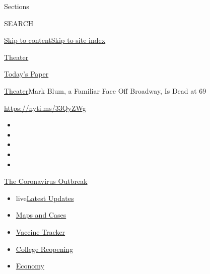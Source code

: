 Sections

SEARCH

\protect\hyperlink{site-content}{Skip to
content}\protect\hyperlink{site-index}{Skip to site index}

\href{https://www.nytimes3xbfgragh.onion/section/theater}{Theater}

\href{https://myaccount.nytimes3xbfgragh.onion/auth/login?response_type=cookie\&client_id=vi}{}

\href{https://www.nytimes3xbfgragh.onion/section/todayspaper}{Today's
Paper}

\href{/section/theater}{Theater}\textbar{}Mark Blum, a Familiar Face Off
Broadway, Is Dead at 69

\url{https://nyti.ms/33QyZWg}

\begin{itemize}
\item
\item
\item
\item
\item
\end{itemize}

\href{https://www.nytimes3xbfgragh.onion/news-event/coronavirus?action=click\&pgtype=Article\&state=default\&region=TOP_BANNER\&context=storylines_menu}{The
Coronavirus Outbreak}

\begin{itemize}
\tightlist
\item
  live\href{https://www.nytimes3xbfgragh.onion/2020/08/04/world/coronavirus-covid-19.html?action=click\&pgtype=Article\&state=default\&region=TOP_BANNER\&context=storylines_menu}{Latest
  Updates}
\item
  \href{https://www.nytimes3xbfgragh.onion/interactive/2020/us/coronavirus-us-cases.html?action=click\&pgtype=Article\&state=default\&region=TOP_BANNER\&context=storylines_menu}{Maps
  and Cases}
\item
  \href{https://www.nytimes3xbfgragh.onion/interactive/2020/science/coronavirus-vaccine-tracker.html?action=click\&pgtype=Article\&state=default\&region=TOP_BANNER\&context=storylines_menu}{Vaccine
  Tracker}
\item
  \href{https://www.nytimes3xbfgragh.onion/2020/08/02/us/covid-college-reopening.html?action=click\&pgtype=Article\&state=default\&region=TOP_BANNER\&context=storylines_menu}{College
  Reopening}
\item
  \href{https://www.nytimes3xbfgragh.onion/live/2020/08/03/business/stock-market-today-coronavirus?action=click\&pgtype=Article\&state=default\&region=TOP_BANNER\&context=storylines_menu}{Economy}
\end{itemize}

